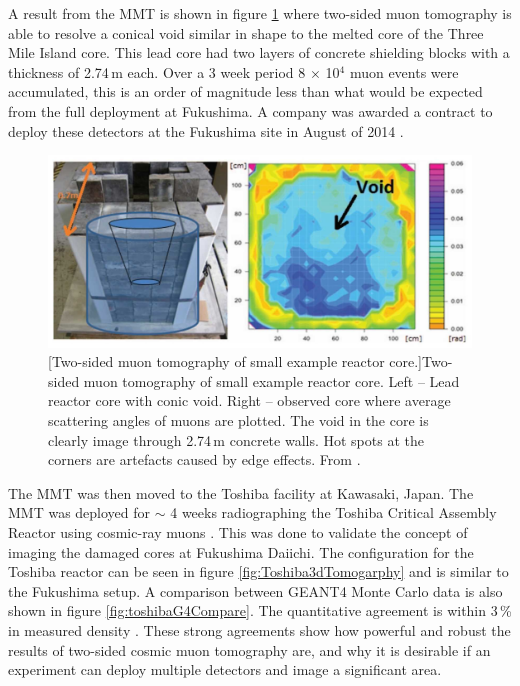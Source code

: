 A result from the MMT is shown in figure \ref{fig:fukushimaFakeCore} where two-sided muon tomography is able to resolve a conical void similar in shape to the melted core of the Three Mile Island core. This lead core had two layers of concrete shielding blocks with a thickness of 2.74\,m each. Over a 3 week period 8 $\times$ 10$^4$ muon events were accumulated, this is an order of magnitude less than what would be expected from the full deployment at Fukushima. A company was awarded a contract to deploy these detectors at the Fukushima site in August of 2014 \cite{compnayFukushimaWeb}.

\begin{figure}[!h]
 \centering
 \includegraphics[width=0.7\linewidth]{Chapter5/Figs/MuTomographyExamples/FukushimaFakeCore.jpg}
 [Two-sided muon tomography of small example reactor core.]{Two-sided muon tomography of small example reactor core. Left -- Lead reactor core with conic void. Right -- observed core where average scattering angles of muons are plotted. The void in the core is clearly image through 2.74\,m concrete walls. Hot spots at the corners are artefacts caused by edge effects. From \cite{miyadera2013imaging}.} 
 \label{fig:fukushimaFakeCore}
\end{figure}

The MMT was then moved to the Toshiba facility at Kawasaki, Japan. The MMT was deployed for $\sim$ 4 weeks radiographing the Toshiba Critical Assembly Reactor using cosmic-ray muons \cite{morris2014analysis}. This was done to validate the concept of imaging the damaged cores at Fukushima Daiichi. The configuration for the Toshiba reactor can be seen in figure \ref{fig:Toshiba3dTomogarphy} and is similar to the Fukushima setup. A comparison between GEANT4 Monte Carlo data is also shown in figure \ref{fig:toshibaG4Compare}. The quantitative agreement is within 3\,\% in measured density \cite{morris2014analysis}. These strong agreements show how powerful and robust the results of two-sided cosmic muon tomography are, and why it is desirable if an experiment can deploy multiple detectors and image a significant area. 

